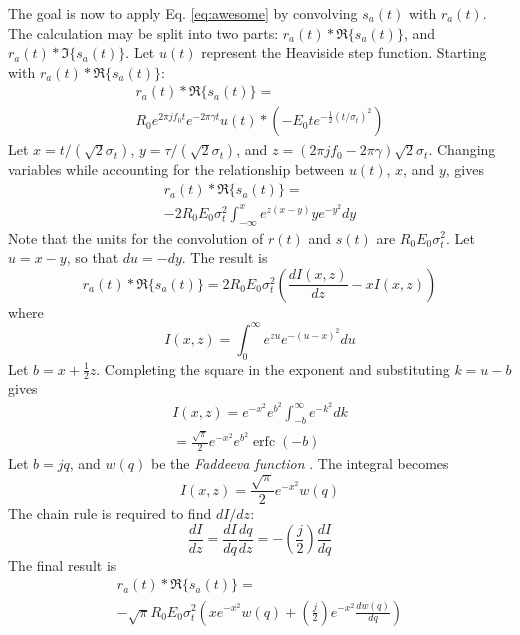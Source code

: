 \documentclass[amsmath,amssymb,aps,prd,10pt,twocolumn,showkeys]{revtex4}
\DeclareMathOperator\erfc{erfc}
\begin{document}
The goal is now to apply Eq. \ref{eq:awesome} by convolving $s_a(t)$ with $r_a(t)$.  The calculation may be split into two parts: $r_a(t) * \Re\lbrace s_a(t) \rbrace$, and $r_a(t) * \Im\lbrace s_a(t) \rbrace$.  Let $u(t)$ represent the Heaviside step function.  Starting with $r_a(t) * \Re\lbrace s_a(t) \rbrace$:
\begin{multline}
r_a(t) * \Re\lbrace s_a(t) \rbrace = \\ R_0 e^{2\pi j f_0 t} e^{-2\pi\gamma t} u(t) * \left(-E_0 t e^{-\frac{1}{2}\left(t/\sigma_t\right)^2}\right)
\end{multline}
Let $x=t/(\sqrt{2}\sigma_t)$, $y=\tau/(\sqrt{2}\sigma_t)$, and $z = (2\pi j f_0 - 2\pi\gamma)\sqrt{2}\sigma_t$.  Changing variables while accounting for the relationship between $u(t)$, $x$, and $y$, gives
\begin{multline}
r_a(t) * \Re\lbrace s_a(t) \rbrace = \\ -2R_0 E_0 \sigma_t^2 \int_{-\infty}^{x} e^{z(x-y)} y e^{-y^2} dy
\end{multline}
Note that the units for the convolution of $r(t)$ and $s(t)$ are $R_0 E_0 \sigma_t^2$.  Let $u = x-y$, so that $du = -dy$. The result is
\begin{equation}
r_a(t) * \Re\lbrace s_a(t) \rbrace = 2R_0 E_0 \sigma_t^2\left(\frac{dI(x,z)}{dz}-xI(x,z)\right)
\end{equation}
where
\begin{equation}
I(x,z) = \int_0^{\infty} e^{zu} e^{-(u-x)^2} du
\end{equation}
Let $b = x+\frac{1}{2} z$. Completing the square in the exponent and substituting $k = u-b$ gives
\begin{multline}
I(x,z) = e^{-x^2} e^{b^2} \int_{-b}^{\infty} e^{-k^2} dk \\ = \frac{\sqrt{\pi}}{2} e^{-x^2} e^{b^2} \erfc(-b)
\end{multline}
Let $b = jq$, and $w(q)$ be the \textit{Faddeeva function} \cite{NIST:DLMF}.  The integral becomes
\begin{equation}
I(x,z) = \frac{\sqrt{\pi}}{2} e^{-x^2} w(q)
\end{equation}
The chain rule is required to find $dI/dz$:
\begin{equation}
\frac{dI}{dz} = \frac{dI}{dq}\frac{dq}{dz} = -\left(\frac{j}{2}\right)\frac{dI}{dq}
\end{equation}
The final result is
\begin{multline}
r_a(t) * \Re\lbrace s_a(t) \rbrace = \\ -\sqrt{\pi} R_0 E_0 \sigma_t^2 \left(x e^{-x^2} w(q) + \left(\frac{j}{2}\right) e^{-x^2} \frac{dw(q)}{dq} \right) \label{eq:Re_result}
\end{multline}
\end{document}
